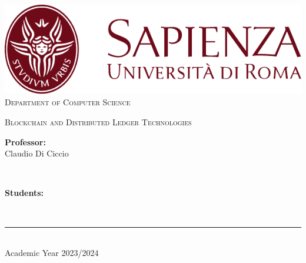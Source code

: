 \begin{titlepage}
	\centering
    \vspace*{0.5 cm}
    \includegraphics[scale = 0.75]{figures/SapienzaLogo.pdf}\\[1.0 cm]	%

    \vspace*{-0.4cm}
    \textsc{\large Department of Computer Science}\\[2.0 cm]	%
    \vspace*{1cm}

    { \fontsize{20.74pt}{18.5pt}\selectfont\bfseries \thetitle \par } %

    \vspace*{0.25cm}
    \textsc{\Large Blockchain and Distributed Ledger Technologies}\\[0.5 cm] %

    \vspace*{2.6cm}
	\begin{minipage}{0.3\textwidth} %
		\begin{flushleft} \large
			\textbf{Professor:}\\
			Claudio Di Ciccio\\
		\end{flushleft}
	\end{minipage}~
	\begin{minipage}{0.42\textwidth} %
		\begin{flushright} \large
		\begin{minipage}{1\textwidth}
		\begin{flushleft} \large
			\textbf{Students:} \\
			\theauthor
        \end{flushleft}
        \end{minipage}
		\end{flushright}
	\end{minipage}\\[3.85 cm]

    \vspace{2cm}
    \rule{\linewidth}{0.2 mm} \\[0.3 cm]
    \vspace*{-0.2cm}
    Academic Year 2023/2024
\end{titlepage}